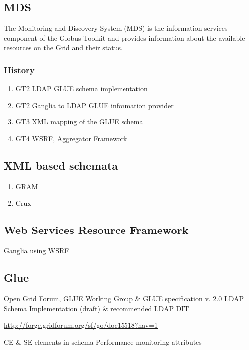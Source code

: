 
\subsection{MDS}
The Monitoring and Discovery System (MDS) is the information services component
of the Globus Toolkit and provides information about the available resources on
the Grid and their status.
\subsubsection{History}
\begin{enumerate}
  \item{GT2} LDAP GLUE schema implementation
  \item{GT2} Ganglia to LDAP GLUE information provider
  \item{GT3} XML mapping of the GLUE schema
  \item{GT4} WSRF, Aggregator Framework
\end{enumerate}

\subsection{XML based schemata}
\begin{enumerate}
  \item{GRAM}
  \item{Crux}
\end{enumerate}

\subsection{Web Services Resource Framework}
Ganglia using WSRF \cite{gangliaWSRF}

\subsection{Glue}
Open Grid Forum, GLUE Working Group \& GLUE specification v. 2.0
LDAP Schema Implementation (draft) \& recommended LDAP DIT

\url{http://forge.gridforum.org/sf/go/doc15518?nav=1}

CE \& SE elements in schema
Performance monitoring attributes

